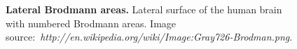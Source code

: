 \begin{figure}[htbp]
	\centering

	\caption[Lateral Brodmann areas]{\textbf{Lateral Brodmann areas.}
	Lateral surface of the human brain with numbered Brodmann areas.
	Image source:~\emph{http://en.wikipedia.org/wiki/Image:Gray726-Brodman.png}.
	\label{fig:appendix:lbrain-side}}
\end{figure}
